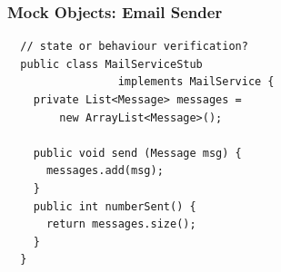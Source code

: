 \documentclass{beamer}
\newenvironment{changemargin}[1]{%
  \begin{list}{}{%
    \setlength{\topsep}{0pt}%
    \setlength{\leftmargin}{#1}%
    \setlength{\rightmargin}{1em}
    \setlength{\listparindent}{\parindent}%
    \setlength{\itemindent}{\parindent}%
    \setlength{\parsep}{\parskip}%
  }%
  \item[]}{\end{list}}
\begin{document}
\begin{frame}[fragile]
  \frametitle{Mock Objects: Email Sender}
  \begin{changemargin}{1cm}
{\small
  \begin{lstlisting}
  // state or behaviour verification?
  public class MailServiceStub
                 implements MailService {
    private List<Message> messages =
        new ArrayList<Message>();
    
    public void send (Message msg) {
      messages.add(msg);
    }
    public int numberSent() {
      return messages.size();
    }
  }     
\end{lstlisting}
}
  \end{changemargin}
\end{frame}
\end{document}
